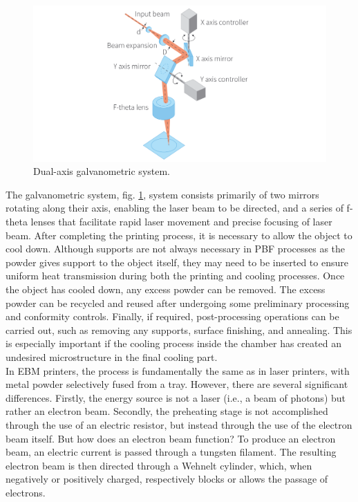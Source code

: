 \begin{figure}[H]
    \centering
    \includegraphics[scale=0.5]{Images/galvanometro.png}
    \caption[Galvanometric system.]{Dual-axis galvanometric system.}
    \label{fig:galvano}
\end{figure}
The galvanometric system, fig. \ref{fig:galvano}, system consists primarily of two mirrors rotating along their axis, enabling the laser beam to be directed, and a series of f-theta lenses that facilitate rapid laser movement and precise focusing of laser beam. After completing the printing process, it is necessary to allow the object to cool down. Although supports are not always necessary in PBF processes as the powder gives support to the object itself, they may need to be inserted to ensure uniform heat transmission during both the printing and cooling processes. Once the object has cooled down, any excess powder can be removed. The excess powder can be recycled and reused after undergoing some preliminary processing and conformity controls. Finally, if required, post-processing operations can be carried out, such as removing any supports, surface finishing, and annealing. This is especially important if the cooling process inside the chamber has created an undesired microstructure in the final cooling part.\\
In EBM printers, the process is fundamentally the same as in laser printers, with metal powder selectively fused from a tray. However, there are several significant differences. Firstly, the energy source is not a laser (i.e., a beam of photons) but rather an electron beam. Secondly, the preheating stage is not accomplished through the use of an electric resistor, but instead through the use of the electron beam itself. But how does an electron beam function? To produce an electron beam, an electric current is passed through a tungsten filament. The resulting electron beam is then directed through a Wehnelt cylinder, which, when negatively or positively charged, respectively blocks or allows the passage of electrons.

